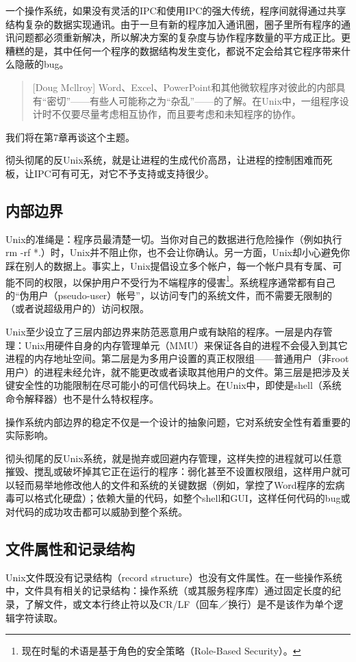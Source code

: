 \documentclass[12pt,oneside]{book}
\begin{document}
\begin{common-format}
一个操作系统，如果没有灵活的IPC和使用IPC的强大传统，程序间就得通过共享结构复杂的数据实现通讯。由于一旦有新的程序加入通讯圈，圈子里所有程序的通讯问题都必须重新解决，所以解决方案的复杂度与协作程序数量的平方成正比。更糟糕的是，其中任何一个程序的数据结构发生变化，都说不定会给其它程序带来什么隐蔽的bug。

\begin{quote}[Doug Mcllroy]
Word、Excel、PowerPoint和其他微软程序对彼此的内部具有“密切”——有些人可能称之为“杂乱”——的了解。在Unix中，一组程序设计时不仅要尽量考虑相互协作，而且要考虑和未知程序的协作。
\end{quote}

我们将在第7章再谈这个主题。

彻头彻尾的反Unix系统，就是让进程的生成代价高昂，让进程的控制困难而死板，让IPC可有可无，对它不予支持或支持很少。

\subsection{内部边界}
Unix的准绳是：程序员最清楚一切。当你对自己的数据进行危险操作（例如执行rm -rf *.）时，Unix并不阻止你，也不会让你确认。另一方面，Unix却小心避免你踩在别人的数据上。事实上，Unix提倡设立多个帐户，每一个帐户具有专属、可能不同的权限，以保护用户不受行为不端程序的侵害\footnote{现在时髦的术语是基于角色的安全策略（Role-Based Security）。}。系统程序通常都有自己的“伪用户（pseudo-user）帐号”，以访问专门的系统文件，而不需要无限制的（或者说超级用户的）访问权限。

Unix至少设立了三层内部边界来防范恶意用户或有缺陷的程序。一层是内存管理：Unix用硬件自身的内存管理单元（MMU）来保证各自的进程不会侵入到其它进程的内存地址空间。第二层是为多用户设置的真正权限组——普通用户（非root用户）的进程未经允许，就不能更改或者读取其他用户的文件。第三层是把涉及关键安全性的功能限制在尽可能小的可信代码块上。在Unix中，即使是shell（系统命令解释器）也不是什么特权程序。

操作系统内部边界的稳定不仅是一个设计的抽象问题，它对系统安全性有着重要的实际影响。

彻头彻尾的反Unix系统，就是抛弃或回避内存管理，这样失控的进程就可以任意摧毁、搅乱或破坏掉其它正在运行的程序：弱化甚至不设置权限组，这样用户就可以轻而易举地修改他人的文件和系统的关键数据（例如，掌控了Word程序的宏病毒可以格式化硬盘）；依赖大量的代码，如整个shell和GUI，这样任何代码的bug或对代码的成功攻击都可以威胁到整个系统。

\subsection{文件属性和记录结构}
Unix文件既没有记录结构（record structure）也没有文件属性。在一些操作系统中，文件具有相关的记录结构：操作系统（或其服务程序库）通过固定长度的纪录，了解文件，或文本行终止符以及CR/LF（回车／换行）是不是该作为单个逻辑字符读取。


\end{common-format}
\end{document}
